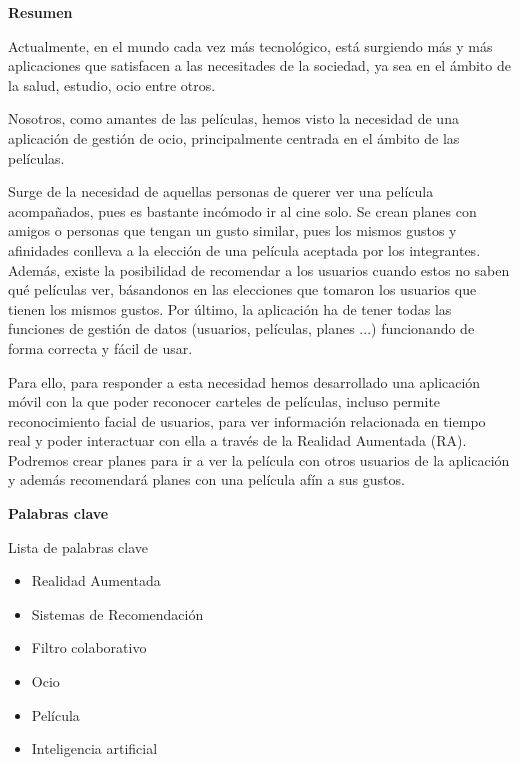
\newpage

\thispagestyle{empty}

\begin{center}

{\bf \Huge Resumen}

  \end{center}
\vspace{1cm}

Actualmente, en el mundo cada vez más tecnológico, está surgiendo más y más aplicaciones que satisfacen
a las necesitades de la sociedad, ya sea en el ámbito de la salud, estudio, ocio entre otros.

Nosotros, como amantes de las películas, hemos visto la necesidad de una aplicación de gestión de ocio,
principalmente centrada en el ámbito de las películas. 

Surge de la necesidad de aquellas personas de querer ver una película acompañados, pues es bastante 
incómodo ir al cine solo. Se crean planes con amigos o personas que tengan un gusto similar, pues los mismos
gustos y afinidades conlleva a la elección de una película aceptada por los integrantes. Además, existe la posibilidad
de recomendar a los usuarios cuando estos no saben qué películas ver, básandonos en las elecciones que tomaron
los usuarios que tienen los mismos gustos. Por último, la aplicación ha de tener todas las funciones de gestión de 
datos (usuarios, películas, planes ...) funcionando de forma correcta y fácil de usar.

Para ello, para responder a esta necesidad hemos desarrollado una aplicación móvil 
con la que poder reconocer carteles de películas, incluso permite reconocimiento facial de usuarios, para 
ver información relacionada en tiempo real y poder interactuar con ella a 
través de la Realidad Aumentada (RA). Podremos crear planes para ir a ver la película con otros 
usuarios de la aplicación y además recomendará planes con una película afín a sus gustos.

\vspace{1cm}


\begin{center}

{\bf \Large Palabras clave}

   \end{center}

   \vspace{0.5cm}
   
   Lista de palabras clave
   \begin{itemize}  
    \item Realidad Aumentada
    \item Sistemas de Recomendación
    \item Filtro colaborativo
    \item Ocio
    \item Película
    \item Inteligencia artificial
  \end{itemize}
   


